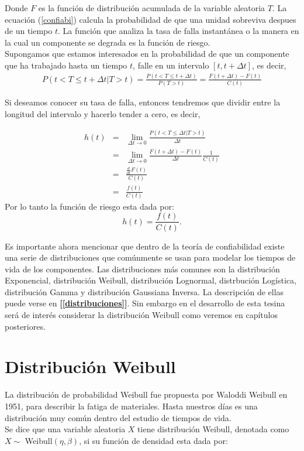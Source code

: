 \noindent Donde $F$ es la funci\'on de distribuci\'on acumulada de la variable aleatoria $T$. La ecuaci\'on (\ref{confiabi})  calcula la probabilidad de que una unidad sobreviva despues de un tiempo $t$. 
\noindent La funci\'on que analiza la tasa de falla instant\'anea o la manera en la cual un componente se degrada es la funci\'on de riesgo.\\[.1cm]
Supongamos que estamos interesados en la probabilidad de que un componente que ha trabajado hasta un tiempo $t$, falle en un intervalo  $[t,t+\Delta t]$, es decir,  
\begin{eqnarray*}
P(t<T\leq t+\Delta t |T>t) =\frac{P(t<T \leq t+\Delta t )}{P(T>t)}=\frac{F(t+\Delta t )-F(t)}{C(t)}
\end{eqnarray*}


\noindent  Si deseamos conocer su tasa de falla, entonces tendremos que dividir entre la longitud del intervalo y hacerlo tender a cero, es decir,
 
\begin{eqnarray*}
h(t)&=&\lim_{\Delta t \rightarrow 0}\frac{P(t<T\leq\Delta t |T>t)}{\Delta t }\\
&=&\lim_{\Delta t \rightarrow 0}\frac{F(t+\Delta t)-F(t)}{\Delta t }\frac{1}{C(t)}\\
&=&\frac{\frac{d}{dt}F(t)}{C(t)}\\
&=&\frac{f(t)}{C(t)}
\end{eqnarray*} 
Por lo tanto la funci\'on de riesgo esta dada por:  $$h(t)=\frac{f(t)}{C(t)}.$$

\noindent Es importante ahora mencionar que dentro de la teor\'ia de confiabilidad existe una serie de distribuciones que com\'unmente se usan para modelar los tiempos de vida de los componentes. Las distribuciones m\'as comunes son la distribuci\'on Exponencial, distribuci\'on Weibull, distribuci\'on Lognormal, distrbuci\'on Log\'istica, distribuci\'on Gamma y distribuci\'on Gaussiana Inversa. La descripci\'on de ellas puede verse en {\bf [\ref{distribuciones}]}. Sin embargo en el desarrollo de esta tesina ser\'a de inter\'es considerar la distribuci\'on Weibull como veremos en cap\'itulos posteriores.
\section{Distribuci\'on Weibull}
\noindent La distribuci\'on de probabilidad Weibull fue propuesta por Waloddi Weibull  en 1951, para describir la fatiga de materiales. Hasta nuestros d\'ias es una distribuci\'on muy com\'un dentro del estudio de tiempos de vida.\\[0.1cm]
\noindent Se dice que una variable aleatoria $X$ tiene distribuci\'on Weibull, denotada como $X\sim$ Weibull$(\eta,\beta )$, si su funci\'on de densidad esta dada por:

